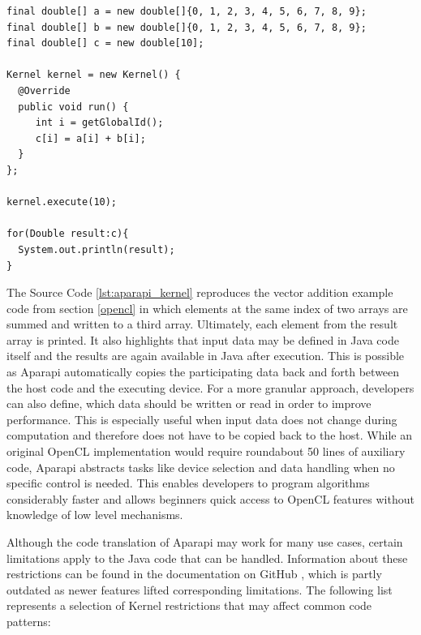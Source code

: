\begin{minipage}{\linewidth}
\begin{lstlisting}[caption=Aparapi Vector Addition Kernel,captionpos=b,label=lst:aparapi_kernel]
final double[] a = new double[]{0, 1, 2, 3, 4, 5, 6, 7, 8, 9};
final double[] b = new double[]{0, 1, 2, 3, 4, 5, 6, 7, 8, 9};
final double[] c = new double[10];

Kernel kernel = new Kernel() {
  @Override
  public void run() {
     int i = getGlobalId();
     c[i] = a[i] + b[i];
  }
};

kernel.execute(10);

for(Double result:c){
  System.out.println(result);
}
\end{lstlisting}
\end{minipage}
The Source Code \ref{lst:aparapi_kernel} reproduces the vector addition example code from section \ref{opencl} in which elements at the same index of two arrays are summed and written to a third array. Ultimately, each element from the result array is printed. It also highlights that input data may be defined in Java code itself and the results are again available in Java after execution. This is possible as Aparapi automatically copies the participating data back and forth between the host code and the executing device. For a more granular approach, developers can also define, which data should be written or read in order to improve performance. This is especially useful when input data does not change during computation and therefore does not have to be copied back to the host. While an original OpenCL implementation would require roundabout 50 lines of auxiliary code, Aparapi abstracts tasks like device selection and data handling when no specific control is needed. This enables developers to program algorithms considerably faster and allows beginners quick access to OpenCL features without knowledge of low level mechanisms.

Although the code translation of Aparapi may work for many use cases, certain limitations apply to the Java code that can be handled. Information about these restrictions can be found in the documentation on GitHub \cite{aparapi_kernel_guidelines}, which is partly outdated as newer features lifted corresponding limitations. The following list represents a selection of Kernel restrictions that may affect common code patterns:

